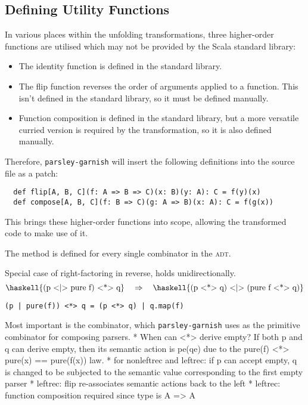 \documentclass[../../main.tex]{subfiles}
\begin{document}
\subsection{Defining Utility Functions}
In various places within the unfolding transformations, three higher-order functions are utilised which may not be provided by the Scala standard library:
\begin{itemize}
  \item The identity function  is defined in the standard library.
  \item The flip function reverses the order of arguments applied to a function. This isn't defined in the standard library, so it must be defined manually.
  \item Function composition is defined in the standard library, but a more versatile curried version is required by the transformation, so it is also defined manually.
\end{itemize}
%
Therefore, \texttt{parsley-garnish} will insert the following definitions into the source file as a patch:
\begin{verbatim}
  def flip[A, B, C](f: A => B => C)(x: B)(y: A): C = f(y)(x)
  def compose[A, B, C](f: B => C)(g: A => B)(x: A): C = f(g(x))
\end{verbatim}
%
This brings these higher-order functions into scope, allowing the transformed code to make use of it.


The  method is defined for every single combinator in the  \textsc{adt}.

Special case of right-factoring in reverse, holds unidirectionally.
\begin{equation*}
\text{\haskell{(p <|> pure f) <*> q}} \quad \Rightarrow \quad \text{\haskell{(p <*> q) <|> (pure f <*> q)}}
\end{equation*}

\begin{verbatim}
(p | pure(f)) <*> q = (p <*> q) | q.map(f)
\end{verbatim}
Most important is the \scala{<*>} combinator, which \texttt{parsley-garnish} uses as the primitive combinator for composing parsers.
* When can <*> derive empty? If both p and q can derive empty, then its semantic action is pe(qe) due to the pure(f) <*> pure(x) == pure(f(x)) law.
* for nonleftrec and leftrec: if p can accept empty, q is changed to be subjected to the semantic value corresponding to the first empty parser
  * leftrec: flip re-associates semantic actions back to the left
  * leftrec: function composition required since type is A => A
%
\end{document}
